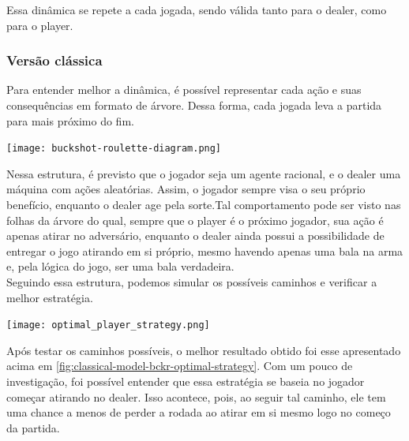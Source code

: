 \documentclass{article}
\begin{document}
Essa dinâmica se repete a cada jogada, sendo válida tanto para o dealer, como para o player.


\subsubsection{Versão clássica}
Para entender melhor a dinâmica, é possível representar cada ação e suas consequências em formato de árvore. Dessa forma, cada jogada leva a partida para mais próximo do fim.


\begin{center}
	\texttt{[image: buckshot-roulette-diagram.png]}
	\label{fig:classical-model-bckr}
\end{center}

Nessa estrutura, é previsto que o jogador seja um agente racional, e o dealer uma máquina com ações aleatórias. Assim, o jogador sempre visa o seu próprio benefício, enquanto o dealer age pela sorte.Tal comportamento pode ser visto nas folhas da árvore do qual, sempre que o player é o próximo jogador, sua ação é apenas atirar no adversário, enquanto o dealer ainda possui a possibilidade de entregar o jogo atirando em si próprio, mesmo havendo apenas uma bala na arma e, pela lógica do jogo, ser uma bala verdadeira.\\
Seguindo essa estrutura, podemos simular os possíveis caminhos e verificar a melhor estratégia.

\begin{center}
	\texttt{[image: optimal\_player\_strategy.png]}
	\label{fig:classical-model-bckr-optimal-strategy}
\end{center}

Após testar os caminhos possíveis, o melhor resultado obtido foi esse apresentado acima em \ref{fig:classical-model-bckr-optimal-strategy}. Com um pouco de investigação, foi possível entender que essa estratégia se baseia no jogador começar atirando no dealer. Isso acontece, pois, ao seguir tal caminho, ele tem uma chance a menos de perder a rodada ao atirar em si mesmo logo no começo da partida.
\end{document}
